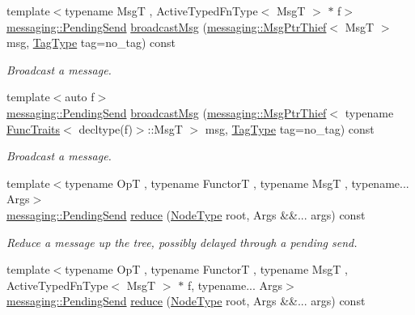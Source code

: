 \begin{DoxyCompactItemize}
{\footnotesize template$<$typename MsgT , Active\+Typed\+Fn\+Type$<$ Msg\+T $>$ $\ast$ f$>$ }\\\hyperlink{structvt_1_1messaging_1_1_pending_send}{messaging\+::\+Pending\+Send} \hyperlink{structvt_1_1objgroup_1_1proxy_1_1_proxy_3_01void_01_4_ae600f4143bb8102bc15264adc713dfea}{broadcast\+Msg} (\hyperlink{structvt_1_1messaging_1_1_msg_ptr_thief}{messaging\+::\+Msg\+Ptr\+Thief}$<$ MsgT $>$ msg, \hyperlink{namespacevt_a84ab281dae04a52a4b243d6bf62d0e52}{Tag\+Type} tag=no\+\_\+tag) const
\begin{DoxyCompactList}\small\item\em Broadcast a message. \end{DoxyCompactList}\item 
{\footnotesize template$<$auto f$>$ }\\\hyperlink{structvt_1_1messaging_1_1_pending_send}{messaging\+::\+Pending\+Send} \hyperlink{structvt_1_1objgroup_1_1proxy_1_1_proxy_3_01void_01_4_a5da935942453d85ca530bf8886a58028}{broadcast\+Msg} (\hyperlink{structvt_1_1messaging_1_1_msg_ptr_thief}{messaging\+::\+Msg\+Ptr\+Thief}$<$ typename \hyperlink{structvt_1_1_func_traits}{Func\+Traits}$<$ decltype(f)$>$\+::MsgT $>$ msg, \hyperlink{namespacevt_a84ab281dae04a52a4b243d6bf62d0e52}{Tag\+Type} tag=no\+\_\+tag) const
\begin{DoxyCompactList}\small\item\em Broadcast a message. \end{DoxyCompactList}\item 
{\footnotesize template$<$typename OpT , typename FunctorT , typename MsgT , typename... Args$>$ }\\\hyperlink{structvt_1_1messaging_1_1_pending_send}{messaging\+::\+Pending\+Send} \hyperlink{structvt_1_1objgroup_1_1proxy_1_1_proxy_3_01void_01_4_a8e3989588197eb5dc128302c93e74468}{reduce} (\hyperlink{namespacevt_a866da9d0efc19c0a1ce79e9e492f47e2}{Node\+Type} root, Args \&\&... args) const
\begin{DoxyCompactList}\small\item\em Reduce a message up the tree, possibly delayed through a pending send. \end{DoxyCompactList}\item 
{\footnotesize template$<$typename OpT , typename FunctorT , typename MsgT , Active\+Typed\+Fn\+Type$<$ Msg\+T $>$ $\ast$ f, typename... Args$>$ }\\\hyperlink{structvt_1_1messaging_1_1_pending_send}{messaging\+::\+Pending\+Send} \hyperlink{structvt_1_1objgroup_1_1proxy_1_1_proxy_3_01void_01_4_a95d80c0e5dc7fad3d49f834692c8da38}{reduce} (\hyperlink{namespacevt_a866da9d0efc19c0a1ce79e9e492f47e2}{Node\+Type} root, Args \&\&... args) const

\end{DoxyCompactItemize}
